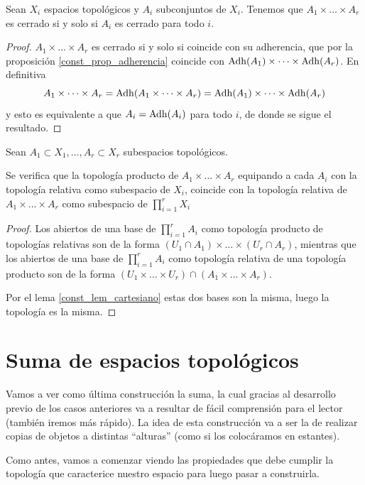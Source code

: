 \begin{cor}[Cerrados]
	Sean $X_i$ espacios topológicos y $A_i$ subconjuntos de $X_i$. Tenemos que
	$A_1 \times \dots \times A_r$ es cerrado si y solo si $A_i$ es cerrado para todo $i$.
\end{cor}
\begin{proof}
	$A_1 \times \dots \times A_r$ es cerrado si y solo si coincide con su adherencia, que por la proposición \ref{const_prop_adherencia} coincide con $\operatorname{\mathrm{Adh}}(A_1) \times \dots \times \operatorname{\mathrm{Adh}}(A_r)$. En definitiva
	\[A_1 \times \dots \times A_r=\operatorname{\mathrm{Adh}}(A_1 \times \dots \times A_r)=\operatorname{\mathrm{Adh}}(A_1) \times \dots \times \operatorname{\mathrm{Adh}}(A_r)\]
	y esto es equivalente a que $A_i=\operatorname{\mathrm{Adh}}(A_i)$ para todo $i$, de donde se sigue el resultado.
\end{proof}	
\begin{prop}[Subespacios]
	Sean $A_1\subset X_1,\dots,A_r\subset X_r$ subespacios topológicos.
	
	Se verifica que la topología producto de $A_1\times\dots\times A_r$ equipando a cada $A_i$ con la topología relativa como subespacio de $X_i$, coincide con la topología relativa de $A_1\times\dots\times A_r$ como subespacio de $\prod_{i=1}^rX_i$
\end{prop}	
\begin{proof}
	Los abiertos de una base de $\prod_{i=1}^rA_i$ como topología producto de topologías relativas son de la forma $(U_1\cap A_1)\times\dots\times(U_r\cap A_r)$, mientras que los abiertos de una base de $\prod_{i=1}^rA_i$ como topología relativa de una topología producto son de la forma $(U_1\times\dots\times U_r)\cap (A_1\times \dots \times A_r)$.
	
	Por el lema \ref{const_lem_cartesiano} estas dos bases son la misma, luego la topología es la misma.
\end{proof}
\section{Suma de espacios topológicos}
Vamos a ver como última construcción la suma, la cual gracias al desarrollo previo de los casos anteriores va a resultar de fácil comprensión para el lector (también iremos más rápido). La idea de esta construcción va a ser la de realizar copias de objetos a distintas ``alturas'' (como si los colocáramos en estantes). 

Como antes, vamos a comenzar viendo las propiedades que debe cumplir la topología que caracterice nuestro espacio para luego pasar a construirla.

